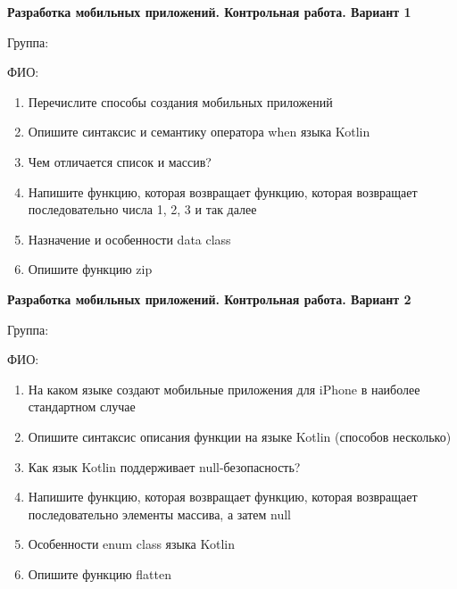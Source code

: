 \documentclass[12pt]{article}
\begin{document}
\begin{minipage}{\textwidth}
\textbf{Разработка мобильных приложений. Контрольная работа. Вариант 1}

Группа: \underline{\hspace{3cm}}

ФИО: \underline{\hspace{10cm}}

\begin{enumerate}
\item Перечислите способы создания мобильных приложений
\item Опишите синтаксис и семантику оператора when языка Kotlin
\item Чем отличается список и массив?
\item Напишите функцию, которая возвращает функцию, которая возвращает последовательно числа 1, 2, 3 и так далее
\item Назначение и особенности data class
\item Опишите функцию zip

\end{enumerate}
\end{minipage}

\newpage\begin{minipage}{\textwidth}
\textbf{Разработка мобильных приложений. Контрольная работа. Вариант 2}

Группа: \underline{\hspace{3cm}}

ФИО: \underline{\hspace{10cm}}

\begin{enumerate}
\item На каком языке создают мобильные приложения для iPhone в наиболее стандартном случае
\item Опишите синтаксис описания функции на языке Kotlin (способов несколько)
\item Как язык Kotlin поддерживает null-безопасность?
\item Напишите функцию, которая возвращает функцию, которая возвращает последовательно элементы массива, а затем null
\item Особенности enum class языка Kotlin
\item Опишите функцию flatten

\end{enumerate}
\end{minipage}
\end{document}
